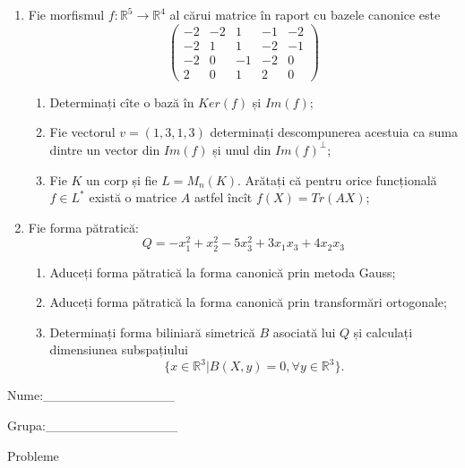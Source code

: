 \documentclass{article}
\begin{document}
\begin{enumerate}
 \item Fie morfismul $f:\mathbb{R}^5 \to \mathbb{R}^4$ al cărui matrice în raport cu bazele canonice este
$$\begin{pmatrix}
-2&-2&1&-1&-2\\
-2&1&1&-2&-1\\
-2&0&-1&-2&0\\
2&0&1&2&0
\end{pmatrix}$$

\begin{enumerate}
\item Determinați cîte o bază în $Ker(f)$ și $Im(f)$;
\item Fie vectorul $v=(1,3,1,3)$ determinați descompunerea acestuia ca suma dintre un vector din $Im(f)$ și unul din $Im(f)^\perp$;
\item Fie $K$ un corp și fie $L=M_n(K)$. Arătați că pentru orice funcțională $f \in L^*$ există o matrice $A$ astfel încît $f(X)=Tr(AX)$;
\end{enumerate}
\item Fie forma pătratică:
$$Q= -x_1^2+x_2^2-5x_3^2+3x_1x_3+4x_2x_3$$

\begin{enumerate}
\item Aduceți forma pătratică la forma canonică prin metoda Gauss;
\item Aduceți forma pătratică la forma canonică prin transformări ortogonale;
\item Determinați forma biliniară simetrică $B$ asociată lui $Q$ și calculați dimensiunea subspațiului
$$\{x \in \mathbb{R}^3 | B(X,y)=0,\forall y \in \mathbb{R}^3\}.$$

\end{enumerate}
\end{enumerate}
\newpage
\begin{flushright}
Nume:\_\_\_\_\_\_\_\_\_\_\_\_\_\_
 
 
Grupa:\_\_\_\_\_\_\_\_\_\_\_\_\_\_
\end{flushright}
\begin{center}
\vspace{2cm}
{\Large Probleme}
\vspace{2cm}
\end{center}
\end{document}

